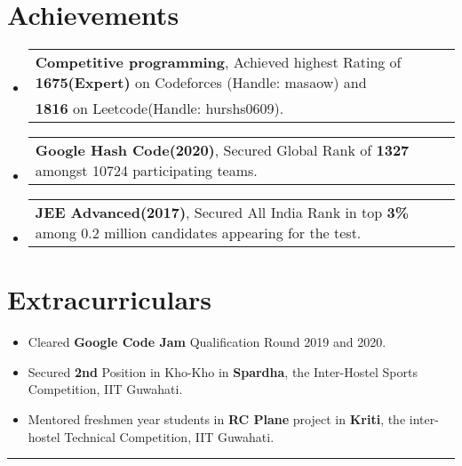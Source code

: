 \documentclass[a4paper,11pt]{article}
\makeatletter
\newcommand{\resumePOR}[3]{
\vspace{0.5mm}\item
    \begin{tabular*}{0.97\textwidth}[t]{l@{\extracolsep{\fill}}r}
        \textbf{#1},\hspace{0.3mm}#2 & \textit{\small{#3}} 
    \end{tabular*}
    \vspace{-2mm}
}
\newcommand{\resumeSubHeadingListStart}{\begin{itemize}[leftmargin=*,labelsep=0mm]}
\newcommand{\resumeSubHeadingListEnd}{\end{itemize}\vspace{2mm}}
\makeatother
\begin{document}
\vspace{-1.5mm}
\section{\textbf{Achievements}}
\vspace{-0.2mm}
\resumeSubHeadingListStart
\resumePOR{Competitive programming} %
    { Achieved highest Rating of \textbf{1675(Expert)} on Codeforces (Handle: masaow) and \\ \textbf{1816} on Leetcode(Handle: hurshs0609).} %
    { } %
\resumePOR{Google Hash Code(2020)} %
{ Secured Global Rank of \textbf{1327} amongst 10724 participating teams.} %
{ } %
\resumePOR{JEE Advanced(2017)} %
    { Secured All India Rank in top \textbf{3\%} among 0.2 million candidates appearing for the test.} %
    { } %
\resumeSubHeadingListEnd
\vspace{-5.5mm}
\section{\textbf{Extracurriculars}}
\vspace{1mm}
\begin{itemize}[leftmargin=1em]  
    \item Cleared \textbf{Google Code Jam} Qualification Round 2019 and 2020.
\end{itemize} 
\vspace{-5mm}
\begin{itemize}[leftmargin=1em]  
    \item Secured \textbf{2nd} Position in Kho-Kho in \textbf{Spardha}, the Inter-Hostel Sports Competition, IIT Guwahati. 
\end{itemize}
\vspace{-5mm}

\begin{itemize}[leftmargin=1em]  
    \item Mentored freshmen year students in \textbf{RC Plane} project in \textbf{Kriti}, the inter-hostel Technical Competition, IIT Guwahati.
\end{itemize}
\vspace{-4mm}
\hspace*{-5mm}\rule{1.035\textwidth}{0.1mm}

\end{document}
